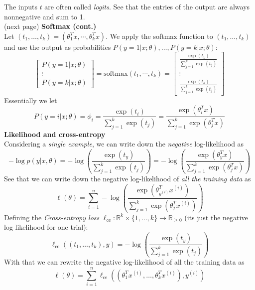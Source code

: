\documentclass{report}
\begin{document}
The inputs $t$ are often called \textit{logits}. See that the entries of the output are always
nonnegative and sum to 1.\\
(next page)
\newpage
\noindent\textbf{Softmax (cont.)}\\
Let $(t_1,\ldots,t_k)=(\theta_1^Tx,\cdots,\theta_k^Tx)$.
We apply the softmax function to $(t_1,\ldots,t_k)$ and use the output as probabilities
$P(y=1|x;\theta),\ldots,P(y=k|x;\theta)$:
\begin{equation*}
\begin{bmatrix}P(y=1|x;\theta)\\\vdots\\P(y=k|x;\theta)
\end{bmatrix}=\text{softmax}(t_1,\cdots,t_k)=
\begin{bmatrix}
\frac{\exp(t_1)}{\sum^k_{j=1}\exp(t_j)}\\\vdots\\
\frac{\exp(t_k)}{\sum^k_{j=1}\exp(t_j)}\end{bmatrix}
\end{equation*}
Essentially we let
\begin{equation*}
P(y=i|x;\theta)=\phi_i=\frac{\exp(t_i)}{\sum^k_{j=1}\exp(t_j)}=\frac{\exp(\theta_i^Tx)}{\sum^k_{j=1}
\exp(\theta_j^Tx)}
\end{equation*}
\textbf{Likelihood and cross-entropy}\\
Considering a \textit{single example}, we can write down
the \textit{negative} log-likelihood as
\begin{equation*}
-\log p(y|x,\theta)=-\log\left(\frac{\exp(t_y)}{\sum^k_{j=1}\exp(t_j)}\right)
=-\log\left(\frac{\exp(\theta_y^Tx)}{\sum^k_{j=1}\exp(\theta_j^Tx)}\right)
\end{equation*}
See that we can write down the negative log-likelihood of \textit{all the training data} as
\begin{equation*}
\ell(\theta)=\sum^n_{i=1}-\log\left(\frac{\exp(\theta_{y^{(i)}}^Tx^{(i)})}{\sum^k_{j=1}
\exp(\theta_j^Tx^{(i)})}\right)
\end{equation*}
Defining the \textit{Cross-entropy loss} $\ell_{\text{ce}}:\mathbb{R}^k\times\{1,\ldots,k\}
\to\mathbb{R}_{\geq0}$ (its just the negative log likelihood for one trial):
\begin{equation*}
\ell_{\text{ce}}((t_1,\ldots,t_k),y)=-\log\left(\frac{\exp(t_y)}{\sum^k_{j=1}\exp(t_j)}\right)
\end{equation*}
With that we can rewrite the negative log-likelihood of all the training data as
\begin{equation*}
\ell(\theta)=\sum^n_{i=1}\ell_{\text{ce}}((\theta_1^Tx^{(i)},\ldots,\theta_k^Tx^{(i)}),y^{(i)})
\end{equation*}
\end{document}
